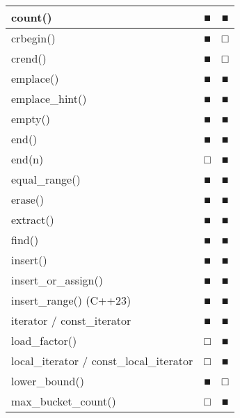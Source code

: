 \begin{longtable}{|l|l|l|}
count()                                      & ■            & ■                       \\ \hline
crbegin()                                    & ■            & □                       \\ \hline
crend()                                      & ■            & □                       \\ \hline
emplace()                                    & ■            & ■                       \\ \hline
emplace\_hint()                              & ■            & ■                       \\ \hline
empty()                                      & ■            & ■                       \\ \hline
end()                                        & ■            & ■                       \\ \hline
end(n)                                       & □            & ■                       \\ \hline
equal\_range()                               & ■            & ■                       \\ \hline
erase()                                      & ■            & ■                       \\ \hline
extract()                                    & ■            & ■                       \\ \hline
find()                                       & ■            & ■                       \\ \hline
insert()                                     & ■            & ■                       \\ \hline
insert\_or\_assign()                         & ■            & ■                       \\ \hline
insert\_range() (C++23)                      & ■            & ■                       \\ \hline
iterator / const\_iterator                   & ■            & ■                       \\ \hline
load\_factor()                               & □            & ■                       \\ \hline
local\_iterator / const\_local\_iterator     & □            & ■                       \\ \hline
lower\_bound()                               & ■            & □                       \\ \hline
max\_bucket\_count()                         & □            & ■                       \\ \hline

\end{longtable}
